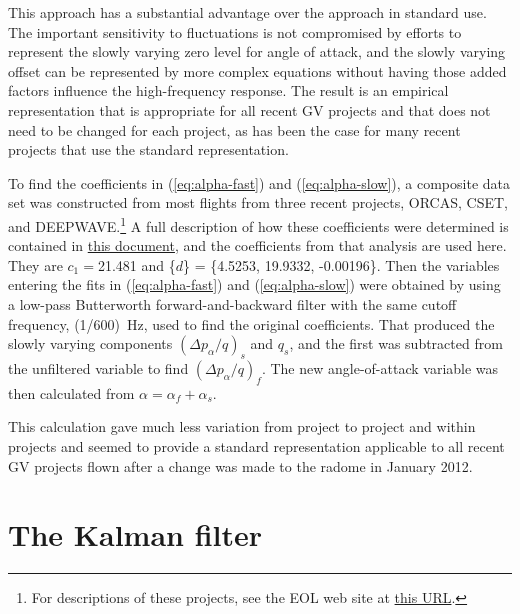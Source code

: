 \documentclass[12pt,twoside,english,12pt,twoside,english]{article}\usepackage[]{graphicx}\usepackage[]{color}
\let\stdsection\section
\renewcommand{\section}{\newpage\stdsection}
\let\OrgIndex\index
\renewcommand*{\index}[1]{\OrgIndex{#1}}
\begin{document}
This approach has a substantial advantage
over the approach in standard use. The important sensitivity to fluctuations
is not compromised by efforts to represent the slowly varying zero
level for angle of attack, and the slowly varying offset can be represented
by more complex equations without having those added factors influence
the high-frequency response. The result is an empirical representation
that is appropriate for all recent GV
projects and that does not need to be changed for each project, as
has been the case for many recent projects that use the standard representation. 

To find the coefficients
in (\ref{eq:alpha-fast}) and (\ref{eq:alpha-slow}), a composite
data set was constructed from most flights from three recent projects,
ORCAS, CSET, and DEEPWAVE.\footnote{For descriptions of these projects, see the EOL web site at \href{https://www.eol.ucar.edu/recent-projects-and-deployments}{this URL}.}
A full description of how these coefficients were determined is contained
in \href{https://drive.google.com/open?id=0B1kIUH45ca5AaFg4Sk9UWDY5OFE}{this document},
and the coefficients from that analysis are used here. They are $c_{1}=$21.481
and \{$d$\} = \{4.5253, 19.9332,
-0.00196\}. Then the variables entering the fits
in (\ref{eq:alpha-fast}) and (\ref{eq:alpha-slow}) were obtained
by using a low-pass Butterworth forward-and-backward filter
 with the same cutoff frequency, (1/600)~Hz, used to find the original
coefficients. That produced the slowly varying components $(\Delta p_{\alpha}/q)_{s}$
and $q_{s}$, and the first was subtracted from the unfiltered variable
to find $(\Delta p_{\alpha}/q)_{f}$. The new angle-of-attack variable
was then calculated from $\alpha=\alpha_{f}+\alpha_{s}$.

This calculation gave much less variation from project to project
and within projects and seemed to provide a standard representation
applicable to all recent GV projects
flown after a change was made to the radome in January 2012. 

\section{The Kalman filter\label{sec:The-Kalman-filter}}
\end{document}
